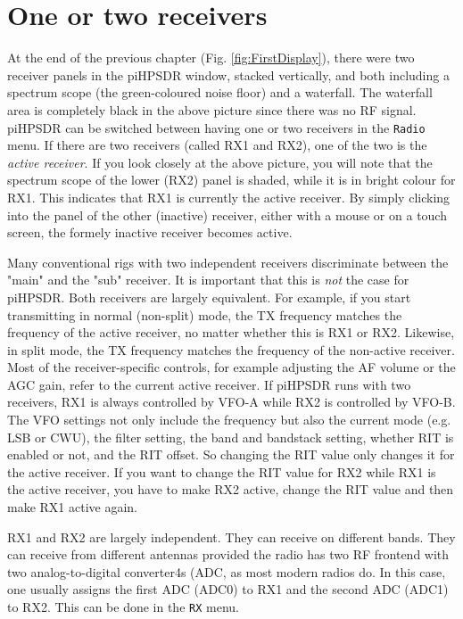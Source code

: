 \documentclass[12pt]{book}
\begin{document}
\section{One or two receivers}
At the end of the previous chapter (Fig. \ref{fig:FirstDisplay}),
 there were two receiver panels in the
piHPSDR window, stacked vertically, and both including a spectrum scope
(the green-coloured noise floor) and a waterfall. The waterfall area
is completely black in the above picture since there was no RF signal.
piHPSDR can be switched between having one or two receivers in the
\texttt{Radio} menu. If there are two receivers (called RX1 and RX2),
 one of the two is the \textit{active receiver}. If you look closely
 at the above picture, you will note that the spectrum scope of
 the lower (RX2) panel is shaded, while it is in bright colour for RX1.
 This indicates that RX1 is currently the active receiver. By simply
 clicking into the panel of the other (inactive) receiver, either with
 a mouse or on a touch screen, the formely inactive receiver becomes
 active.
 
 Many conventional rigs with two independent receivers discriminate
 between the "main" and the "sub" receiver. It is important that
 this is \textit{not} the case for piHPSDR. Both  receivers are
 largely equivalent. For example, if you start transmitting in
 normal (non-split) mode, the TX frequency matches the frequency
 of the active receiver, no matter whether this is RX1 or RX2.
 Likewise, in split mode, the TX frequency matches the frequency
 of the non-active receiver. Most of the receiver-specific controls,
 for example adjusting the AF volume or the AGC gain, refer to the
 current active receiver. If piHPSDR runs with two receivers,
 RX1 is always controlled by VFO-A while RX2 is controlled by VFO-B.
 The VFO settings not only include the frequency but also the
 current mode (e.g. LSB or CWU), the filter setting, the band and
 bandstack setting, whether RIT is enabled or not, and the RIT
 offset. So changing the RIT value only changes it for the active
 receiver. If you want  to change the RIT value for RX2 while RX1 is
 the active receiver, you have to make RX2 active, change the RIT
 value and then make RX1 active again.
 
 RX1 and RX2 are largely independent. They can receive on different
 bands. They can receive from different antennas provided the radio
 has two RF frontend with two analog-to-digital converter4s (ADC,
 as most modern radios do. In this case, one usually
 assigns the first ADC (ADC0) to RX1 and the second ADC (ADC1) to
 RX2. This can be done in the \texttt{RX} menu.
 
\end{document}

